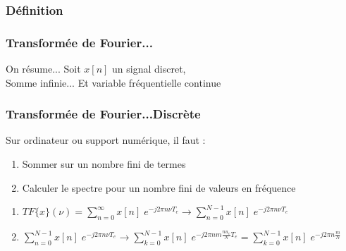 \documentclass{beamer}
\begin{document}
\subsubsection{Définition}
\begin{frame}
\frametitle{Transformée de Fourier...}
On résume... Soit $x[n]$ un signal discret,\\
\vspace{0.3cm}
\vspace{0.3cm}
Somme infinie... Et variable fréquentielle continue\\
\vspace{0.3cm}


\end{frame} 

\begin{frame}
\frametitle{Transformée de Fourier...Discrète}
Sur ordinateur ou support numérique, il faut :\\ 
\vspace{0.2cm}
\begin{enumerate}
\item<2-> Sommer sur un nombre fini de termes
\item<3-> Calculer le spectre pour un nombre fini de valeurs en fréquence 
\end{enumerate}

\vspace{0.3cm}
\vspace{0.3cm}
\begin{enumerate}
\item<5-> $TF\{ x \}(\nu) = \sum_{n = 0}^{\infty} x[n] \; e^{-j 2 \pi n \nu T_e} \rightarrow  \sum_{n = 0}^{N-1} x[n] \; e^{-j 2 \pi n \nu T_e}$\vspace{0.4cm}
\item<6->$\sum_{n = 0}^{N-1} x[n] \; e^{-j 2 \pi n \nu T_e} \rightarrow  \sum_{k = 0}^{N-1} x[n] \; e^{-j 2 \pi n m \frac{nu_e}{N} T_e } = \sum_{k = 0}^{N-1} x[n] \; e^{-j 2 \pi n \frac{m}{N} } $
\end{enumerate} 

\end{frame}
\end{document}

